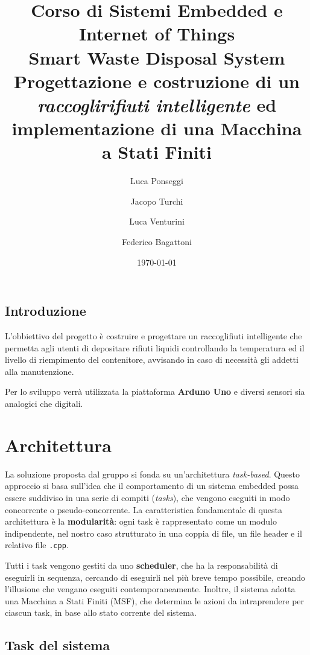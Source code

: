 \documentclass{report}
\title{
\normalsize{Corso di Sistemi Embedded e Internet of Things}\\
\Huge{Smart Waste Disposal System}\\
\vspace{0.75em}
\large{Progettazione e costruzione di un \textit{raccoglirifiuti intelligente} ed implementazione di una Macchina a Stati Finiti}
}
\author{Luca Ponseggi \and Jacopo Turchi \and Luca Venturini \and Federico Bagattoni}
\date{\today}
\begin{document}
\maketitle

\tableofcontents
\newpage
\section*{Introduzione}
\par{
L'obbiettivo del progetto è costruire e progettare un raccoglifiuti intelligente che permetta agli utenti di depositare rifiuti liquidi controllando la temperatura ed il livello di riempimento del contenitore, avvisando in caso di necessità gli addetti alla manutenzione.
}
\par{
Per lo sviluppo verrà utilizzata la piattaforma \textbf{Arduno Uno} e diversi sensori sia analogici che digitali.
}

\chapter{Architettura}
\par {
La soluzione proposta dal gruppo si fonda su un'architettura \textit{task-based}. Questo approccio si basa sull'idea che il comportamento di un sistema embedded possa essere suddiviso in una serie di compiti (\textit{tasks}), che vengono eseguiti in modo concorrente o pseudo-concorrente. La caratteristica fondamentale di questa architettura è la \textbf{modularità}: ogni task è rappresentato come un modulo indipendente, nel nostro caso strutturato in una coppia di file, un file header e il relativo file \texttt{.cpp}.
}
\par {
Tutti i task vengono gestiti da uno \textbf{scheduler}, che ha la responsabilità di eseguirli in sequenza, cercando di eseguirli nel più breve tempo possibile, creando l'illusione che vengano eseguiti contemporaneamente. Inoltre, il sistema adotta una Macchina a Stati Finiti (MSF), che determina le azioni da intraprendere per ciascun task, in base allo stato corrente del sistema.
}

\section{Task del sistema}
\end{document}
